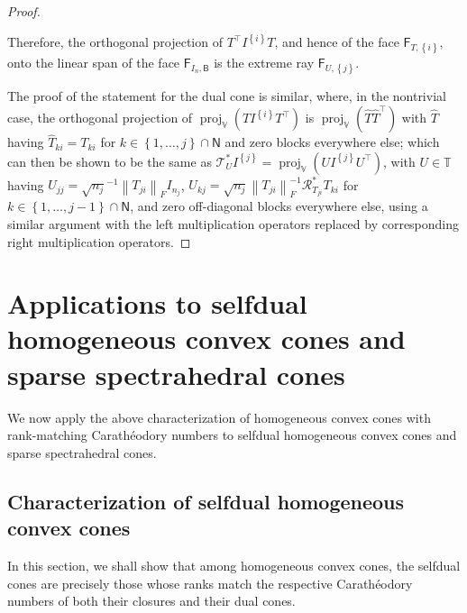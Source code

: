 \documentclass[oneside]{amsart}
\theoremstyle{plain}
\theoremstyle{definition}
\theoremstyle{remark}
\numberwithin{equation}{section}
\DeclareMathOperator{\proj}{proj}
\begin{document}
\begin{proof}
\begin{enumerate}[label=(\roman*)]
\end{enumerate}
Therefore, the orthogonal projection of $T^{\top} I^{\left\{i\right\}} T$,
and hence of the face $\mathsf{F}_{T,\left\{i\right\}}$, onto the linear
span of the face $\mathsf{F}_{I_{n},\mathsf{B}}$ is the extreme ray
$\mathsf{F}_{U,\left\{j\right\}}$.

The proof of the statement for the dual cone is similar, where, in the
nontrivial case, the orthogonal projection of $\proj_{\mathbb{V}}\left( T
I^{\left\{i\right\}} T^{\top} \right)$ is $\proj_{\mathbb{V}}\left( \hat{T}
\hat{T}^{\top} \right)$ with $\hat{T}$ having $\hat{T}_{ki} = T_{ki}$ for
$k \in \left\{1, \dotsc, j\right\} \cap \mathsf{N}$ and zero blocks
everywhere else; which can then be shown to be the same as
$\mathcal{T}^{*}_{U} I^{\left\{j\right\}} = \proj_{\mathbb{V}}\left( U
I^{\left\{j\right\}} U^{\top} \right)$, with $U \in \mathbb{T}$ having
$U_{jj} = \sqrt{n_{j}}^{-1} \left\lVert T_{ji}\right\rVert_{F} I_{n_{j}}$,
$U_{kj} = \sqrt{n_{j}} \left\lVert T_{ji}\right\rVert_{F}^{-1}
\mathcal{R}^{*}_{T_{ji}} T_{ki}$ for $k \in \left\{1, \dotsc, j-1\right\}
\cap \mathsf{N}$, and zero off-diagonal blocks everywhere else, using a
similar argument with the left multiplication operators replaced by
corresponding right multiplication operators.
\end{proof}

\section{Applications to selfdual homogeneous convex cones and sparse
spectrahedral cones}
\label{section:applications}

We now apply the above characterization of homogeneous convex cones with
rank-matching Carath\'eodory numbers to selfdual homogeneous convex cones
and sparse spectrahedral cones.

\subsection{Characterization of selfdual homogeneous convex cones}
\label{section:selfdualhomogeneouscones}

In this section, we shall show that among homogeneous convex cones, the
selfdual cones are precisely those whose ranks match the respective
Carath\'eodory numbers of both their closures and their dual cones.
\end{document}
